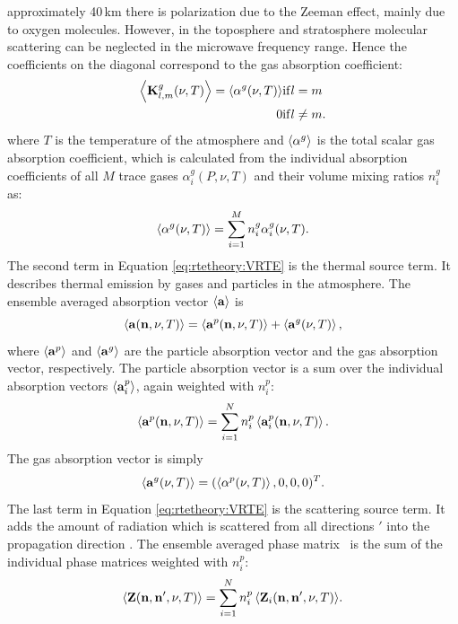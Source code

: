 approximately 40\,km there is polarization due to the Zeeman effect,
mainly due to oxygen molecules.  However, in the toposphere and
stratosphere molecular scattering can be neglected in the microwave
frequency range. Hence the coefficients on the diagonal correspond to
the gas absorption coefficient:
\begin{eqnarray}
\left\langle {\bf K}^{g}_{l,m}(\nu, T) \right\rangle =
\left\langle \alpha^g(\nu, T) \right\rangle & \mathrm{if } l = m \\
0 & \mathrm{if } l \neq m.
\end{eqnarray}
where $T$ is the temperature of the atmosphere and $\left\langle  \alpha^g
 \right\rangle$ is the total scalar gas absorption coefficient, which is
calculated from the individual absorption coefficients of all $M$
trace gases $\alpha_i^g(P, \nu, T)$ and their volume mixing ratios
$n^g_i$ as:
\begin{equation}
   \left\langle  \alpha^g(\nu, T)  \right\rangle =  \sum_{i=1}^M  n^g_i \alpha_i^g(\nu, T).
\end{equation}
The second term in Equation \ref{eq:rtetheory:VRTE} is the thermal source term. It
describes thermal emission by gases and particles in the atmosphere.
The ensemble averaged absorption vector $\left\langle {\bf a} \right\rangle$ is
\begin{equation}
  \left\langle {\bf a} ({\bf n}, \nu, T) \right\rangle  =
  \left\langle {\bf a}^{p} ({\bf n}, \nu, T) \right\rangle +
  \left\langle  {\bf a}^{g} (\nu, T)  \right\rangle,
\end{equation}
where $\left\langle {\bf a}^{p} \right\rangle$ and $\left\langle  {\bf a}^{g}  \right\rangle$
are the particle absorption vector and the gas absorption vector,
respectively.  The particle absorption vector is a sum over the
individual absorption vectors $\left\langle  {\bf a}_i^p  \right\rangle $, again
weighted with $n^p_i$:
\begin{equation}
  \left\langle {\bf a}^{p}({\bf n}, \nu, T) \right\rangle = \sum_{i=1}^N n^p_i \left\langle {\bf a}_i^p ({\bf n}, \nu, T) \right\rangle.
\label{eq:rtetheory:abs_vec_p}
\end{equation}
The gas absorption vector is simply
\begin{equation}
 \left\langle  {\bf a}^{g}(\nu, T)  \right\rangle  = (\left\langle \alpha^p(\nu, T) \right\rangle, 0, 0, 0)^T.
\end{equation}
The last term in Equation \ref{eq:rtetheory:VRTE} is the scattering source term.
It adds the amount of radiation which is scattered from all directions
\PDir$'$ into the propagation direction \PDir.  The ensemble
averaged phase matrix \EnsAvr\PhaMat\ is the sum of the individual
phase matrices  weighted with $n^p_i$:
\begin{equation}
  \left\langle {\bf Z}({\bf n}, {\bf n}', \nu, T) \right\rangle = 
  \sum_{i=1}^N {n^p_i\left\langle {\bf Z}_i({\bf n},
    {\bf n}', \nu, T) \right\rangle}.
  \label{eq:rtetheory:pha_mat}
\end{equation}

